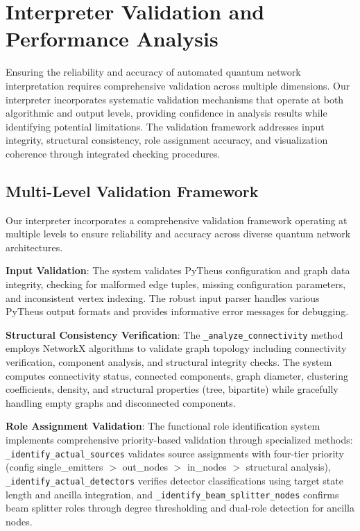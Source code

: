 \documentclass[11pt,a4paper]{article}
\begin{document}
\section{Interpreter Validation and Performance Analysis}

Ensuring the reliability and accuracy of automated quantum network interpretation requires comprehensive validation across multiple dimensions. Our interpreter incorporates systematic validation mechanisms that operate at both algorithmic and output levels, providing confidence in analysis results while identifying potential limitations. The validation framework addresses input integrity, structural consistency, role assignment accuracy, and visualization coherence through integrated checking procedures.

\subsection{Multi-Level Validation Framework}

Our interpreter incorporates a comprehensive validation framework operating at multiple levels to ensure reliability and accuracy across diverse quantum network architectures.

\textbf{Input Validation}: The system validates PyTheus configuration and graph data integrity, checking for malformed edge tuples, missing configuration parameters, and inconsistent vertex indexing. The robust input parser handles various PyTheus output formats and provides informative error messages for debugging.

\textbf{Structural Consistency Verification}: The \texttt{\_analyze\_connectivity} method employs NetworkX algorithms to validate graph topology including connectivity verification, component analysis, and structural integrity checks. The system computes connectivity status, connected components, graph diameter, clustering coefficients, density, and structural properties (tree, bipartite) while gracefully handling empty graphs and disconnected components.

\textbf{Role Assignment Validation}: The functional role identification system implements comprehensive priority-based validation through specialized methods: \texttt{\_identify\_actual\_sources} validates source assignments with four-tier priority (config single\_emitters $>$ out\_nodes $>$ in\_nodes $>$ structural analysis), \texttt{\_identify\_actual\_detectors} verifies detector classifications using target state length and ancilla integration, and \texttt{\_identify\_beam\_splitter\_nodes} confirms beam splitter roles through degree thresholding and dual-role detection for ancilla nodes.
\end{document}
